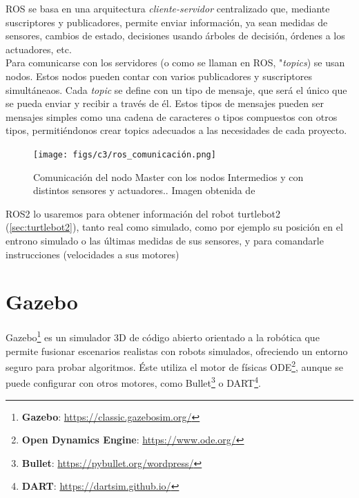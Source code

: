 ROS se basa en una arquitectura \textit{cliente-servidor} centralizado que, mediante suscriptores y publicadores, permite enviar información, ya sean medidas de sensores, cambios de estado, decisiones usando árboles de decisión, órdenes a los actuadores, etc.\\

Para comunicarse con los servidores (o como se llaman en ROS, "\textit{topics}) se usan nodos. Estos nodos pueden contar con varios publicadores y suscriptores simultáneaos.
Cada \textit{topic} se define con un tipo de mensaje, que será el único que se pueda enviar y recibir a través de él. Estos tipos de mensajes pueden ser mensajes simples como una cadena de caracteres o tipos compuestos con otros tipos, permitiéndonos crear topics adecuados a las necesidades de cada proyecto.\\

\begin{figure} [H]
    \begin{center}
        \texttt{[image: figs/c3/ros\_comunicación.png]}
    \end{center}
    \caption[Comunicación del nodo Master con los nodos Intermedios y con distintos sensores y actuadores.]{Comunicación del nodo Master con los nodos Intermedios y con distintos sensores y actuadores.. Imagen obtenida de \cite{comunicacion_ros2}}
    \label{fig:ros_master_comunicacion}
\end{figure}

ROS2 lo usaremos para obtener información del robot turtlebot2 (\ref{sec:turtlebot2}), tanto real como simulado, como por ejemplo su posición en el entrono simulado o las últimas medidas de sus sensores, y para comandarle instrucciones (velocidades a sus motores)

\section{Gazebo}
\label{sec:gazebo}

Gazebo\footnote{\textbf{Gazebo}: \url{https://classic.gazebosim.org/}} es un simulador 3D de código abierto orientado a la robótica que permite fusionar escenarios realistas con robots simulados, ofreciendo un entorno seguro para probar algoritmos. Éste utiliza el motor de físicas ODE\footnote{\textbf{Open Dynamics Engine}: \url{https://www.ode.org/}}, aunque se puede configurar con otros motores, como Bullet\footnote{\textbf{Bullet}: \url{https://pybullet.org/wordpress/}} o DART\footnote{\textbf{DART}: \url{https://dartsim.github.io/}}.\\

